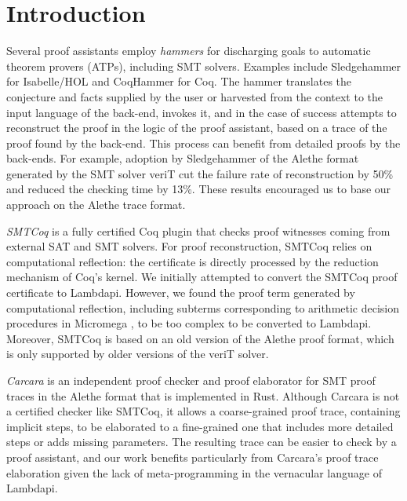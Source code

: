 \chapter{Introduction}\label{ch:introduction}


Several proof assistants employ \emph{hammers} for discharging goals to automatic theorem provers (ATPs), including SMT solvers. Examples include Sledgehammer \cite{Sledgehammer} for Isabelle/HOL and CoqHammer \cite{coqhammer1,coqhammer2} for Coq.
The hammer translates the conjecture and facts supplied by the user or harvested
from the context to the input language of the back-end, invokes it, and in the
case of success attempts to reconstruct the proof in the logic of the proof
assistant, based on a trace of the proof found by the back-end.
%
This process can benefit from detailed proofs by the back-ends.
%
For example, adoption by Sledgehammer of the Alethe format generated by the SMT solver veriT \cite{isabelle1,isabelle2} cut the failure rate of reconstruction by 50\% and reduced the checking time by 13\%. These results encouraged us to base our approach on the Alethe trace format.

\emph{SMTCoq} \cite{smtcoq} is a fully certified Coq plugin that checks proof witnesses coming from external SAT and SMT solvers. For proof reconstruction, SMTCoq relies on computational reflection: the certificate is directly processed by the reduction mechanism of Coq's kernel.
We initially attempted to convert the SMTCoq proof certificate to Lambdapi. However, we found the proof term generated by computational reflection, including subterms corresponding to arithmetic decision procedures in Micromega \cite{micromega}, to be too complex to be converted to Lambdapi.
%
Moreover, SMTCoq is based on an old version of the Alethe proof format, which is
only supported by older versions of the veriT solver.

\emph{Carcara} \cite{carcara} is an independent proof checker and proof elaborator for SMT proof traces in the Alethe format that is implemented in Rust. Although Carcara is not a certified checker like SMTCoq, it allows a coarse-grained proof trace, containing implicit steps, to be elaborated to a fine-grained one that includes more detailed steps or adds missing parameters. The resulting trace can be easier to check by a proof assistant, and our work benefits particularly from Carcara's proof trace elaboration given the lack of meta-programming in the vernacular language of Lambdapi.

